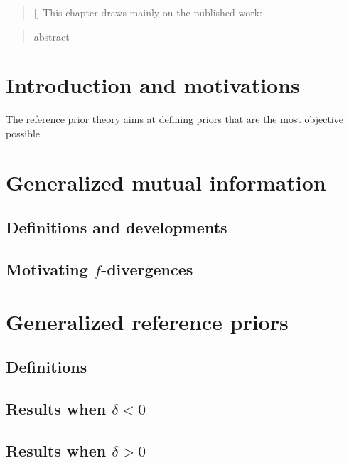 
\begin{abstract}[\hspace*{-10pt}]
    This chapter draws mainly on the published work:   %
\end{abstract}

\begin{abstract}
    abstract
\end{abstract}

\minitoc

\section{Introduction and motivations}

The reference prior theory aims at defining priors that are the most objective possible




\section{Generalized mutual information}

\subsection{Definitions and developments}

\subsection{Motivating $f$-divergences}


\section{Generalized reference priors}

\subsection{Definitions}

\subsection{Results when $\delta<0$}

\subsection{Results when $\delta>0$}


